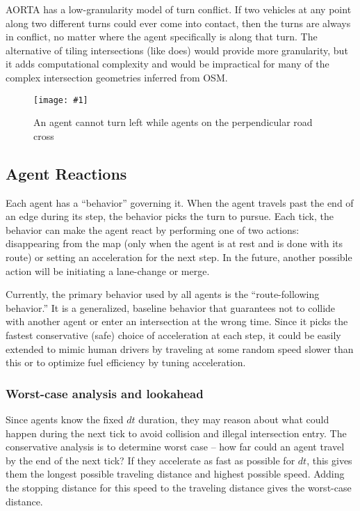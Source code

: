 \documentclass[letterpaper, 10 pt, conference]{ieeeconf}  %
\newcommand{\pix}[3]{
  \begin{figure}[h]
    \centering \texttt{[image: \#1]}
    \caption{#2}
  \end{figure}
}
\begin{document}
 AORTA has a low-granularity model of turn conflict. If two vehicles at any point
along two different turns could ever come into contact, then the turns are
always in conflict, no matter where the agent specifically is along that turn.
The alternative of tiling intersections (like \cite{JAIR08-dresner}  does) would
provide more granularity, but it adds computational complexity and would be
impractical for many of the complex intersection geometries inferred from OSM.


\pix{turn_conflicts.png}
    {An agent cannot turn left while agents on the perpendicular road cross}
    {scale=0.5}



\subsection{Agent Reactions}

Each agent has a ``behavior'' governing it. When the agent travels past the end
of an edge during its step, the behavior picks the turn to pursue. Each tick,
the behavior can make the agent react by performing one of two actions:
disappearing from the map (only when the agent is at rest and is done with its
route) or setting an acceleration for the next step. In the future, another
possible action will be initiating a lane-change or
merge.

Currently, the primary behavior used by all agents is the ``route-following
behavior.'' It is a generalized, baseline behavior that guarantees not to
collide with another agent or enter an intersection at the wrong time. Since it
picks the fastest conservative (safe) choice of acceleration at each step, it
could be easily extended to mimic human drivers by traveling at some random
speed slower than this or to optimize fuel efficiency by tuning acceleration.

\subsubsection{Worst-case analysis and lookahead}

Since agents know the fixed $dt$ duration, they may reason about what could
happen during the next tick to avoid collision and illegal intersection entry.
The conservative analysis is to determine worst case -- how far could an agent
travel by the end of the next tick? If they accelerate as fast as possible for
$dt$, this gives them the longest possible traveling distance and highest
possible speed. Adding the stopping distance for this speed to the traveling
distance gives the worst-case distance.
\end{document}
